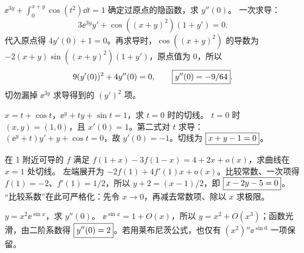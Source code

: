 $\ee^{3y}+\int_0^{x+y}\cos(t^2)\dd t=1$ 确定过原点的隐函数，求 $y''(0)$。
\sol 一次求导：
\[3\ee^{3y}y'+\cos((x+y)^2)(1+y')=0.\]
代入原点得 $4y'(0)+1=0$。再求导时，$\cos((x+y)^2)$ 的导数为
$-2(x+y)\sin((x+y)^2)(1+y')$，原点值为 0，所以
\[9(y'(0))^2+4y''(0)=0,\qquad \boxed{y''(0)=-9/64}.\]
切勿漏掉 $\ee^{3y}$ 求导得到的 $(y')^2$ 项。

$x=t+\cos t$，$\ee^y+ty+\sin t=1$，求 $t=0$ 时的切线。
\sol $t=0$ 时 $(x,y)=(1,0)$，且 $x'(0)=1$。第二式对 $t$ 求导：
$(\ee^y+t)y'+y+\cos t=0$，故 $y'(0)=-1$。切线为 $\boxed{x+y-1=0}$。

在 1 附近可导的 $f$ 满足
$f(1+x)-3f(1-x)=4+2x+o(x)$，求曲线在 $x=1$ 处切线。
\sol 左端展开为 $-2f(1)+4f'(1)x+o(x)$。比较常数、一次项得 $f(1)=-2$、$f'(1)=1/2$，所以 $y+2=(x-1)/2$，即 $\boxed{x-2y-5=0}$。
“比较系数”在此可严格化：先令 $x\to0$，再减去常数项、除以 $x$ 求极限。

$y=x^2\ee^{\sin x}$，求 $y''(0)$。
\sol $\ee^{\sin x}=1+O(x)$，所以 $y=x^2+O(x^3)$；函数光滑，由二阶系数得 $\boxed{y''(0)=2}$。若用莱布尼茨公式，也仅有 $(x^2)''\ee^{\sin0}$ 一项保留。
